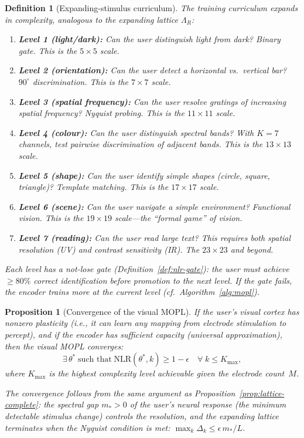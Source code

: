 \documentclass[11pt,a4paper]{article}
\newtheorem{proposition}[theorem]{Proposition}
\newtheorem{definition}[theorem]{Definition}
\begin{document}
\begin{definition}[Expanding-stimulus curriculum]%
\label{def:stimulus-curriculum}
The training curriculum expands in complexity,
analogous to the expanding lattice $\Lambda_R$:
\begin{enumerate}[nosep]
\item \textbf{Level 1 (light/dark):}
  Can the user distinguish light from dark?
  Binary gate.
  This is the $5 \times 5$ scale.
\item \textbf{Level 2 (orientation):}
  Can the user detect a horizontal vs.\ vertical bar?
  $90^\circ$ discrimination.
  This is the $7 \times 7$ scale.
\item \textbf{Level 3 (spatial frequency):}
  Can the user resolve gratings of increasing
  spatial frequency?
  Nyquist probing.
  This is the $11 \times 11$ scale.
\item \textbf{Level 4 (colour):}
  Can the user distinguish spectral bands?
  With $K = 7$ channels, test pairwise discrimination
  of adjacent bands.
  This is the $13 \times 13$ scale.
\item \textbf{Level 5 (shape):}
  Can the user identify simple shapes
  (circle, square, triangle)?
  Template matching.
  This is the $17 \times 17$ scale.
\item \textbf{Level 6 (scene):}
  Can the user navigate a simple environment?
  Functional vision.
  This is the $19 \times 19$ scale---the
  ``formal game'' of vision.
\item \textbf{Level 7 (reading):}
  Can the user read large text?
  This requires both spatial resolution (UV)
  and contrast sensitivity (IR).
  The $23 \times 23$ and beyond.
\end{enumerate}
Each level has a not-lose gate
(Definition~\ref{def:nlr-gate}):
the user must achieve $\geq\!80\%$ correct identification
before promotion to the next level.
If the gate fails, the encoder trains more at the current
level (cf.\ Algorithm~\ref{alg:mopl}).
\end{definition}

\begin{proposition}[Convergence of the visual MOPL]%
\label{prop:visual-convergence}
If the user's visual cortex has nonzero plasticity
(i.e., it can learn \emph{any} mapping from electrode
stimulation to percept), and if the encoder has sufficient
capacity (universal approximation), then the visual MOPL
converges:
\[
  \exists\, \theta^* \;\text{such that}\;
  \mathrm{NLR}(\theta^*, k) \geq 1 - \epsilon
  \quad \forall\; k \leq K_{\max},
\]
where $K_{\max}$ is the highest complexity level
achievable given the electrode count~$M$.

The convergence follows from the same argument as
Proposition~\ref{prop:lattice-complete}:
the spectral gap $m_* > 0$ of the user's neural response
(the minimum detectable stimulus change)
controls the resolution, and the expanding lattice
terminates when the Nyquist condition is met:
$\max_k \Delta_k \leq \epsilon \, m_* / L$.
\end{proposition}
\end{document}
